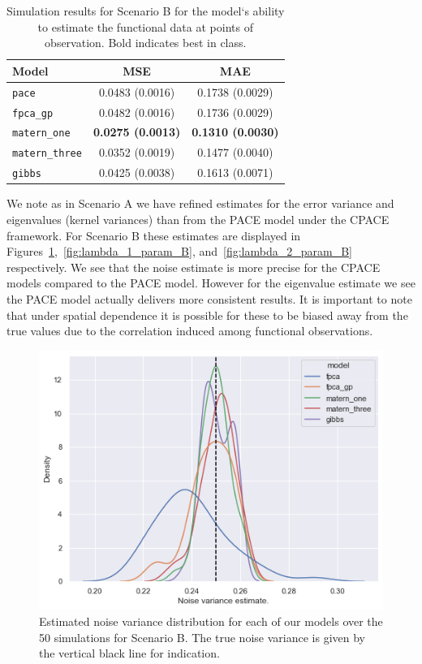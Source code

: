 \begin{table}
	\caption[Simulation results for Scenario B on observed data.]{Simulation results for Scenario B for the model`s ability to estimate the functional data at points of observation. Bold indicates best in class.}
	\centering
	\label{tab:train_B}
	\begin{tabular}{lcc}
		\toprule
		\textbf{Model} & \textbf{MSE} & \textbf{MAE} \\
		\midrule
		\verb*|pace| & 0.0483 (0.0016) & 0.1738	(0.0029) \\
		\verb*|fpca_gp| & 0.0482 (0.0016) & 0.1736 (0.0029) \\
		\verb*|matern_one| & \textbf{0.0275	(0.0013)} & \textbf{0.1310	(0.0030)} \\
		\verb*|matern_three| & 0.0352 (0.0019) & 0.1477	(0.0040) \\
		\verb*|gibbs| & 0.0425 (0.0038) & 0.1613 (0.0071)\\
		\bottomrule
	\end{tabular}
\end{table}

We note as in Scenario A we have refined estimates for the error variance and eigenvalues (kernel variances) than from the PACE model under the CPACE framework. 
For Scenario B these estimates are displayed in Figures~\ref{fig:noise_param_B},~\ref{fig:lambda_1_param_B}, and~\ref{fig:lambda_2_param_B} respectively. 
We see that the noise estimate is more precise for the CPACE models compared to the PACE model.
However for the eigenvalue estimate we see the PACE model actually delivers more consistent results.
It is important to note that under spatial dependence it is possible for these to be biased away from the true values due to the correlation induced among functional observations.

\begin{figure}
	\centering
	\includegraphics[width=\textwidth]{noise_param_B}
	\caption[Estimated noise variance distribution for each of our models over the 50 simulations for Scenario B.]{Estimated noise variance distribution for each of our models over the 50 simulations for Scenario B. The true noise variance is given by the vertical black line for indication.}
	\label{fig:noise_param_B}
\end{figure}


